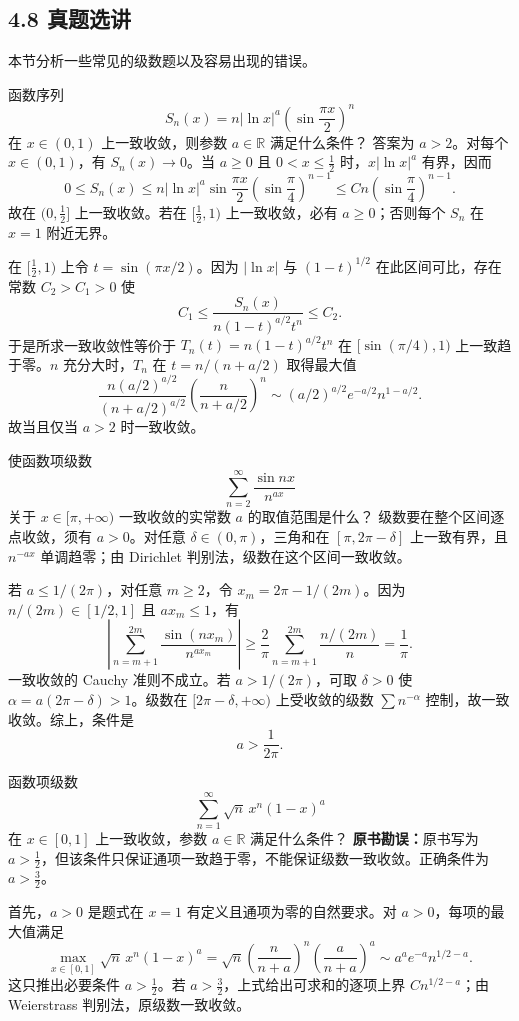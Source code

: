\subsection*{4.8 真题选讲}

本节分析一些常见的级数题以及容易出现的错误。

函数序列
\[
S_n(x)=n|\ln x|^a\left(\sin\frac{\pi x}{2}\right)^n
\]
在 $x\in(0,1)$ 上一致收敛，则参数 $a\in\mathbb R$ 满足什么条件？
\sol 答案为 $a>2$。对每个 $x\in(0,1)$，有 $S_n(x)\to0$。当 $a\geq0$ 且 $0<x\leq\frac12$ 时，$x|\ln x|^a$ 有界，因而
\[
0\leq S_n(x)
\leq n|\ln x|^a\sin\frac{\pi x}{2}
\left(\sin\frac\pi4\right)^{n-1}
\leq Cn\left(\sin\frac\pi4\right)^{n-1}.
\]
故在 $(0,\frac12]$ 上一致收敛。若在 $[\frac12,1)$ 上一致收敛，必有 $a\geq0$；否则每个 $S_n$ 在 $x=1$ 附近无界。

在 $[\frac12,1)$ 上令 $t=\sin(\pi x/2)$。因为 $|\ln x|$ 与 $(1-t)^{1/2}$ 在此区间可比，存在常数 $C_2>C_1>0$ 使
\[
C_1\leq \frac{S_n(x)}{n(1-t)^{a/2}t^n}\leq C_2.
\]
于是所求一致收敛性等价于 $T_n(t)=n(1-t)^{a/2}t^n$ 在 $[\sin(\pi/4),1)$ 上一致趋于零。$n$ 充分大时，$T_n$ 在 $t=n/(n+a/2)$ 取得最大值
\[
\frac{n(a/2)^{a/2}}{(n+a/2)^{a/2}}
\left(\frac{n}{n+a/2}\right)^n
\sim (a/2)^{a/2}e^{-a/2}n^{1-a/2}.
\]
故当且仅当 $a>2$ 时一致收敛。

使函数项级数
\[
\sum_{n=2}^{\infty}\frac{\sin nx}{n^{ax}}
\]
关于 $x\in[\pi,+\infty)$ 一致收敛的实常数 $a$ 的取值范围是什么？
\sol 级数要在整个区间逐点收敛，须有 $a>0$。对任意 $\delta\in(0,\pi)$，三角和在 $[\pi,2\pi-\delta]$ 上一致有界，且 $n^{-ax}$ 单调趋零；由 Dirichlet 判别法，级数在这个区间一致收敛。

若 $a\leq1/(2\pi)$，对任意 $m\geq2$，令 $x_m=2\pi-1/(2m)$。因为 $n/(2m)\in[1/2,1]$ 且 $ax_m\leq1$，有
\[
\left|\sum_{n=m+1}^{2m}\frac{\sin(nx_m)}{n^{ax_m}}\right|
\geq\frac2\pi\sum_{n=m+1}^{2m}\frac{n/(2m)}n
=\frac1\pi.
\]
一致收敛的 Cauchy 准则不成立。若 $a>1/(2\pi)$，可取 $\delta>0$ 使 $\alpha=a(2\pi-\delta)>1$。级数在 $[2\pi-\delta,+\infty)$ 上受收敛的级数 $\sum n^{-\alpha}$ 控制，故一致收敛。综上，条件是
\[
\boxed{a>\frac1{2\pi}}.
\]

函数项级数
\[
\sum_{n=1}^{\infty}\sqrt n\,x^n(1-x)^a
\]
在 $x\in[0,1]$ 上一致收敛，参数 $a\in\mathbb R$ 满足什么条件？
\sol \textbf{原书勘误：}原书写为 $a>\frac12$，但该条件只保证通项一致趋于零，不能保证级数一致收敛。正确条件为 $a>\frac32$。

首先，$a>0$ 是题式在 $x=1$ 有定义且通项为零的自然要求。对 $a>0$，每项的最大值满足
\[
\max_{x\in[0,1]}\sqrt n\,x^n(1-x)^a
=\sqrt n\left(\frac{n}{n+a}\right)^n
\left(\frac{a}{n+a}\right)^a
\sim a^ae^{-a}n^{1/2-a}.
\]
这只推出必要条件 $a>\frac12$。若 $a>\frac32$，上式给出可求和的逐项上界 $Cn^{1/2-a}$；由 Weierstrass 判别法，原级数一致收敛。

